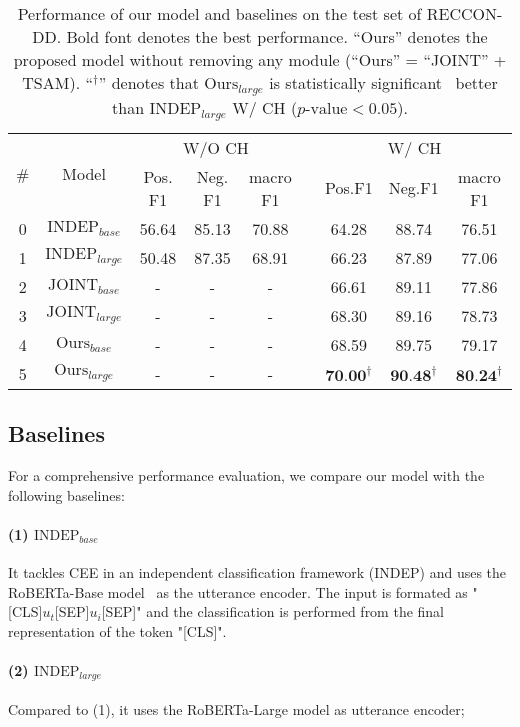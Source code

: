 \documentclass[11pt]{article}
\begin{document}
\begin{table*}[tbp]
\centering
\begin{tabular}{@{}c|c|ccccccc@{}}
\hline
\multirow{2}{*}{\#} & \multirow{2}{*}{Model} & \multicolumn{3}{c}{W/O CH}   &  & \multicolumn{3}{c}{W/ CH}  \\ \cmidrule(lr){3-5} \cmidrule(l){7-9} 
                    &                        & Pos. F1 & Neg. F1 & macro F1 &  & Pos.F1 & Neg.F1 & macro F1 \\ \hline\hline
0                   & $\text{INDEP}_{base}$            &    56.64     &    85.13     &   70.88       &  &    64.28    &    88.74    &   76.51       \\
1                   & $\text{INDEP}_{large}$           &    50.48     &    87.35     &    68.91      &  &   66.23     &     87.89   &     77.06     \\ \hline
2                   & $\text{JOINT}_{base}$             & -       & -       & -        &  &   66.61     &    89.11    &   77.86       \\
3                   & $\text{JOINT}_{large}$           & -       & -       & -        &  &   68.30     &  89.16      &      78.73    \\ \hline
4                   & $\text{Ours}_{base}$              & -       & -       & -        &  &     68.59   &     89.75   &    79.17      \\
5                   & $\text{Ours}_{large}$           & -       & -       & -        &  &  $\textbf{70.00}^{\dagger}$       &    $\textbf{90.48}^{\dagger}$    &    $\textbf{80.24}^{\dagger}$      \\ \hline
\end{tabular}
\caption{Performance of our model and baselines on the test set of RECCON-DD. Bold font denotes the best performance.
``Ours'' denotes the proposed model without removing any module (``Ours'' = ``JOINT'' + TSAM). ``$^{\dagger}$'' denotes that $\text{Ours}_{large}$ is statistically significant~\citep{koehn2004statistical} better than $\text{INDEP}_{large}$ W/ CH ($p$-$\text{value} < 0.05$).}
\label{tab-2}
\end{table*}

\subsection{Baselines}
For a comprehensive performance evaluation, we compare our model with the following baselines:  

\paragraph{(1) $\text{INDEP}_{base}$}\citep{poria2021recognizing} It tackles CEE in an independent classification framework (INDEP) and uses the RoBERTa-Base model~\citep{liu2019roberta} as the utterance encoder. The input is formated as "[CLS]$u_t$[SEP]$u_i$[SEP]" and the classification is performed from the final representation of the token "[CLS]". \paragraph{(2) $\text{INDEP}_{large}$}\citep{poria2021recognizing} Compared to (1), it uses the RoBERTa-Large model as utterance encoder; 
\end{document}
